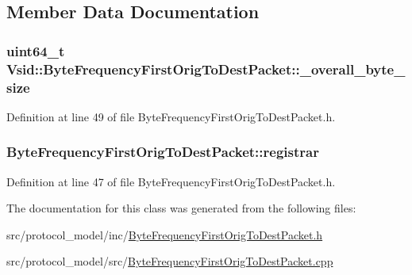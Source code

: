 \subsection{Member Data Documentation}
\hypertarget{class_vsid_1_1_byte_frequency_first_orig_to_dest_packet_afaa99faf2c05ab93ed2cc21e581c4ece}{
\subsubsection[{\-\_\-overall\-\_\-byte\-\_\-size}]{\setlength{\rightskip}{0pt plus 5cm}uint64\-\_\-t Vsid\-::\-Byte\-Frequency\-First\-Orig\-To\-Dest\-Packet\-::\-\_\-overall\-\_\-byte\-\_\-size\hspace{0.3cm}{\ttfamily [protected]}}}\label{class_vsid_1_1_byte_frequency_first_orig_to_dest_packet_afaa99faf2c05ab93ed2cc21e581c4ece}


Definition at line 49 of file Byte\-Frequency\-First\-Orig\-To\-Dest\-Packet.\-h.

\hypertarget{class_vsid_1_1_byte_frequency_first_orig_to_dest_packet_aa7c68993e8cec93d93cedfb9c6924bfb}{
\subsubsection[{registrar}]{ Byte\-Frequency\-First\-Orig\-To\-Dest\-Packet\-::registrar\hspace{0.3cm}{\ttfamily [static]}}}\label{class_vsid_1_1_byte_frequency_first_orig_to_dest_packet_aa7c68993e8cec93d93cedfb9c6924bfb}


Definition at line 47 of file Byte\-Frequency\-First\-Orig\-To\-Dest\-Packet.\-h.



The documentation for this class was generated from the following files\-:\begin{DoxyCompactItemize}
\item 
src/protocol\-\_\-model/inc/\hyperlink{_byte_frequency_first_orig_to_dest_packet_8h}{Byte\-Frequency\-First\-Orig\-To\-Dest\-Packet.\-h}\item 
src/protocol\-\_\-model/src/\hyperlink{_byte_frequency_first_orig_to_dest_packet_8cpp}{Byte\-Frequency\-First\-Orig\-To\-Dest\-Packet.\-cpp}\end{DoxyCompactItemize}
